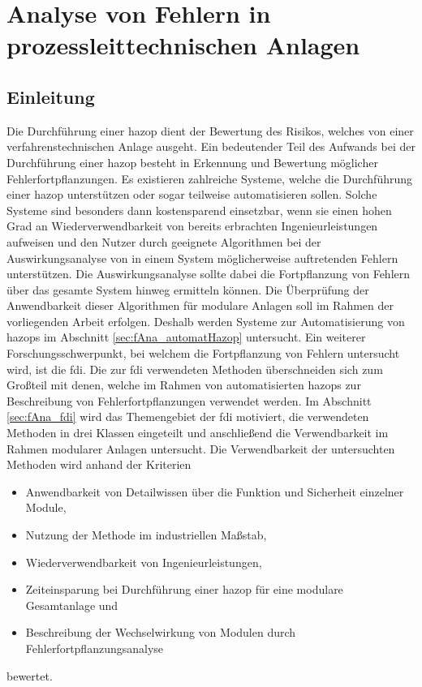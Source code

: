\chapter{Analyse von Fehlern in prozessleittechnischen Anlagen} \label{ch:fehlerfortpfl}
\section{Einleitung}
Die Durchf\"uhrung einer \ac{hazop} dient der Bewertung des Risikos, welches von einer verfahrenstechnischen Anlage ausgeht. Ein bedeutender Teil des Aufwands bei der Durchf\"uhrung einer \ac{hazop} besteht in Erkennung und Bewertung m\"oglicher Fehlerfortpflanzungen. \newline
Es existieren zahlreiche Systeme, welche die Durchf\"uhrung einer \ac{hazop} unterst\"utzen oder sogar teilweise automatisieren sollen. Solche Systeme sind besonders dann kostensparend einsetzbar, wenn sie einen hohen Grad an Wiederverwendbarkeit von bereits erbrachten Ingenieurleistungen aufweisen und den Nutzer durch geeignete Algorithmen bei der Auswirkungsanalyse von in einem System m\"oglicherweise auftretenden Fehlern unterst\"utzen. Die Auswirkungsanalyse sollte dabei die Fortpflanzung von Fehlern \"uber das gesamte System hinweg ermitteln k\"onnen. Die \"Uberpr\"ufung der Anwendbarkeit dieser Algorithmen f\"ur modulare Anlagen soll im Rahmen der vorliegenden Arbeit erfolgen. Deshalb werden Systeme zur Automatisierung von \acp{hazop} im Abschnitt \ref{sec:fAna_automatHazop} untersucht. \newline
Ein weiterer Forschungsschwerpunkt, bei welchem die Fortpflanzung von Fehlern untersucht wird, ist die \acf{fdi}. Die zur \ac{fdi} verwendeten Methoden \"uberschneiden sich zum Gro\ss{}teil mit denen, welche im Rahmen von automatisierten \acp{hazop} zur Beschreibung von Fehlerfortpflanzungen verwendet werden. Im Abschnitt \ref{sec:fAna_fdi} wird das Themengebiet der \ac{fdi} motiviert, die verwendeten Methoden in drei Klassen eingeteilt und anschlie\ss{}end die Verwendbarkeit im Rahmen modularer Anlagen untersucht. Die Verwendbarkeit der untersuchten Methoden wird anhand der Kriterien 
\begin{itemize}
\item Anwendbarkeit von Detailwissen \"uber die Funktion und Sicherheit einzelner Module,
\item Nutzung der Methode im industriellen Ma\ss{}stab, 
\item Wiederverwendbarkeit von Ingenieurleistungen,
\item Zeiteinsparung bei Durchf\"uhrung einer \ac{hazop} f\"ur eine modulare Gesamtanlage und
\item Beschreibung der Wechselwirkung von Modulen durch Fehlerfortpflanzungsanalyse
\end{itemize} bewertet.
